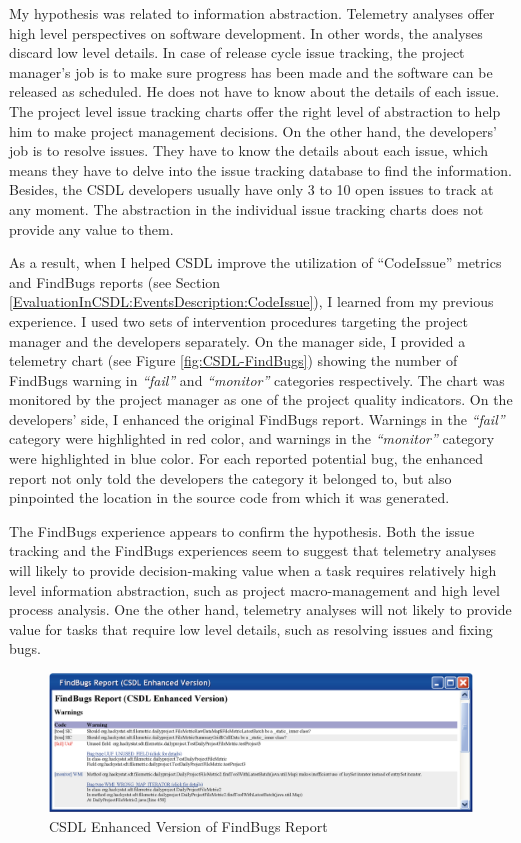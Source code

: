 My hypothesis was related to information abstraction. Telemetry analyses offer high level perspectives on software development. In other words, the analyses discard low level details. In case of release cycle issue tracking, the project manager's job is to make sure progress has been made and the software can be released as scheduled. He does not have to know about the details of each issue. The project level issue tracking charts offer the right level of abstraction to help him to make project management decisions. On the other hand, the developers' job is to resolve issues. They have to know the details about each issue, which means they have to delve into the issue tracking database to find the information. Besides, the CSDL developers usually have only 3 to 10 open issues to track at any moment. The abstraction in the individual issue tracking charts does not provide any value to them.

As a result, when I helped CSDL improve the utilization of ``CodeIssue'' metrics and FindBugs reports (see Section \ref{EvaluationInCSDL:EventsDescription:CodeIssue}), I learned from my previous experience. I used two sets of intervention procedures targeting the project manager and the developers separately. On the manager side, I provided a telemetry chart (see Figure \ref{fig:CSDL-FindBugs}) showing the number of FindBugs warning in \textit{``fail''} and \textit{``monitor''} categories respectively. The chart was monitored by the project manager as one of the project quality indicators. On the developers' side, I enhanced the original FindBugs report. Warnings in the \textit{``fail''} category were highlighted in red color, and warnings in the \textit{``monitor''} category were highlighted in blue color. For each reported potential bug, the enhanced report not only told the developers the category it belonged to, but also pinpointed the location in the source code from which it was generated.

The FindBugs experience appears to confirm the hypothesis. Both the issue tracking and the FindBugs experiences seem to suggest that telemetry analyses will likely to provide decision-making value when a task requires relatively high level information abstraction, such as project macro-management and high level process analysis. One the other hand, telemetry analyses will not likely to provide value for tasks that require low level details, such as resolving issues and fixing bugs.


\begin{figure}[tbp]
  \center
  \includegraphics[width=1.00\textwidth]{figures/CSDL-FindBugsReport}
  \caption{CSDL Enhanced Version of FindBugs Report} 
  \label{fig:CSDL-FindBugsReport}
\end{figure}




